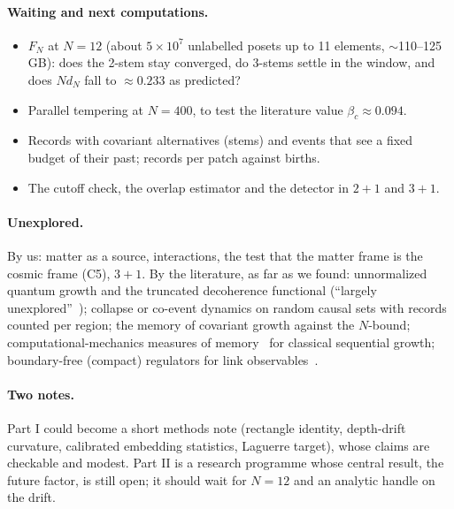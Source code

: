 \documentclass[11pt,a4paper]{article}
\begin{document}
\paragraph{Waiting and next computations.}
\begin{itemize}[leftmargin=*,itemsep=1pt]
\item $F_N$ at $N=12$ (about $5\times10^7$ unlabelled posets up to 11 elements, $\sim$110--125\,GB): does the 2-stem stay converged, do 3-stems settle in the window, and does $N d_N$ fall to $\approx0.233$ as predicted?
\item Parallel tempering at $N=400$, to test the literature value $\beta_c\approx0.094$.
\item Records with covariant alternatives (stems) and events that see a fixed budget of their past; records per patch against births.
\item The cutoff check, the overlap estimator and the detector in $2+1$ and $3+1$.
\end{itemize}

\paragraph{Unexplored.} By us: matter as a source, interactions, the test that the matter frame is the cosmic frame (C5), $3+1$. By the literature, as far as we found: unnormalized quantum growth and the truncated decoherence functional (``largely unexplored''~\cite[§6.4]{Surya19}); collapse or co-event dynamics on random causal sets with records counted per region; the memory of covariant growth against the $N$-bound; computational-mechanics measures of memory~\cite{Gu12,YBNG18} for classical sequential growth; boundary-free (compact) regulators for link observables~\cite{BK26}.

\paragraph{Two notes.} Part I could become a short methods note (rectangle identity, depth-drift curvature, calibrated embedding statistics, Laguerre target), whose claims are checkable and modest. Part II is a research programme whose central result, the future factor, is still open; it should wait for $N=12$ and an analytic handle on the drift.

\appendix
\end{document}
